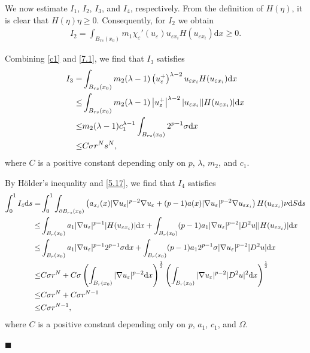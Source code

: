 \documentclass[onecolumn]{autart}
\newenvironment{proof}{{\it Proof: \enspace}}{\hfill $\blacksquare$\par}
\begin{document}
\begin{proof}
		{We now estimate $I_1$, $I_2$, $I_3$, and $I_4$, respectively.}	 	From the definition of $H(\eta)$, it is clear that $H(\eta)\eta \geq 0$. Consequently, for $I_2$ we obtain
		\begin{align}\label{7.4}
			I_2=\int_{B_{rs}(x_0)} m_1 \chi_\varepsilon' \left( u_\varepsilon \right)u_{\varepsilon x_i}H(u_{\varepsilon x_i})\mathrm{d}x \geq 0.
		\end{align}
		
		Combining \eqref{c1} and \eqref{7.1}, we find that $I_3$ satisfies
		\begin{align}
			I_3
			=
			&\int_{B_{rs}(x_0)}m_2 (\lambda-1) \left(  u_{\varepsilon}^{+} \right) ^{\lambda-2}u_{\varepsilon x_i}H(u_{\varepsilon x_i})\mathrm{d}x
			\notag\\ \leq
			& \int_{B_{rs}(x_0)}m_2 (\lambda-1) \left|  u_{\varepsilon}^{+} \right| ^{\lambda-2} |u_{\varepsilon x_i}||H(u_{\varepsilon x_i})|\mathrm{d}x
			\notag\\ \leq
			& m_2 (\lambda-1)c_{1} ^{\lambda-1}\int_{B_{rs}(x_0)} 2^{p-1}\sigma\mathrm{d}x
			\notag\\ \leq
			&C\sigma r^N s^N,\label{7.5}
		\end{align}
		where $C$ is a positive  constant  depending only on  $p$, $\lambda$, $m_2$,   and $c_1$.
		
		By H\"older's inequality and \eqref{5.17}, we find that $I_4$ satisfies
		\begin{align}
			\int_{0}^{1}I_4\mathrm{d}s
			=
			&\int_{0}^{1}\int_{\partial B_{ rs}(x_0)}\left(a_{x_i}(x) |\nabla u_\varepsilon|^{p-2} \nabla u_\varepsilon +(p-1) a(x)  |\nabla u_\varepsilon|^{p-2} \nabla u_{\varepsilon x_i}\right) H(u_{\varepsilon x_i})  \nu  \mathrm{d}S \mathrm{d}s
			\notag\\\leq
			& \int_{B_r(x_0)}a_1 |\nabla u_\varepsilon|^{p-1} |H(u_{\varepsilon x_i})| \mathrm{d}x + \int_{B_r(x_0)}(p-1) a_1  |\nabla u_\varepsilon|^{p-2} |D^2 u| |H(u_{\varepsilon x_i})| \mathrm{d}x
			\notag\\ \leq
			& \int_{B_r(x_0)}a_1 |\nabla u_\varepsilon|^{p-1}  2^{p-1}\sigma \mathrm{d}x + \int_{B_r(x_0)}(p-1) a_1   2^{p-1}\sigma |\nabla u_\varepsilon|^{p-2} |D^2 u|  \mathrm{d}x
			\notag\\\leq
			& C\sigma r^N + C\sigma\left(\int_{B_r(x_0)} |\nabla u_\varepsilon|^{p-2}  \mathrm{d}x  \right) ^\frac{1}{2} \left(\int_{B_r(x_0)} |\nabla u_\varepsilon|^{p-2} |D^2 u|^2 \mathrm{d}x  \right) ^\frac{1}{2}
			\notag\\ \leq
			& C\sigma r^N +  C\sigma r^{N-1}
			\notag\\ \leq
			& C\sigma r^{N-1},\label{7.6}
		\end{align}
		where $C$ is a positive  constant  depending only on $p$, $a_1$, $c_1$,    and $\Omega$.
		

\end{proof}
\end{document}
